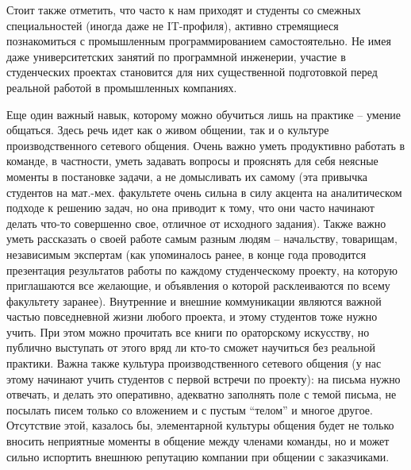 \documentclass[a4paper]{article}
\begin{document}
Стоит также отметить, что часто к нам приходят и студенты со смежных специальностей (иногда даже не IT-профиля), активно стремящиеся познакомиться с промышленным программированием самостоятельно. Не имея даже университетских занятий по программной инженерии, участие в студенческих проектах становится для них существенной подготовкой перед реальной работой в промышленных компаниях.

Еще один важный навык, которому можно обучиться лишь на практике -- умение общаться. Здесь речь идет как о живом общении, так и о культуре производственного сетевого общения.  Очень важно уметь продуктивно работать в команде, в частности, уметь задавать вопросы и прояснять для себя неясные моменты в постановке задачи, а не домысливать их самому (эта привычка студентов на мат.-мех. факультете очень сильна в силу акцента на аналитическом подходе к решению задач, но она приводит к тому, что они часто начинают делать что-то совершенно свое, отличное от исходного задания). Также важно уметь рассказать о своей работе самым разным людям -- начальству, товарищам, независимым экспертам (как упоминалось ранее, в конце года проводится презентация результатов работы по каждому студенческому проекту, на которую приглашаются все желающие, и объявления о которой расклеиваются по всему факультету заранее). Внутренние и внешние коммуникации являются важной частью повседневной жизни любого проекта, и этому студентов тоже нужно учить. При этом можно прочитать все книги по ораторскому искусству, но публично выступать от этого вряд ли кто-то сможет научиться без реальной практики. Важна также культура производственного сетевого общения (у нас этому начинают учить студентов с первой встречи по проекту): на письма нужно отвечать, и делать это оперативно, адекватно заполнять поле с темой письма, не посылать писем только со вложением и с пустым ``телом'' и многое другое. Отсутствие этой, казалось бы, элементарной культуры общения будет не только вносить неприятные моменты в общение между членами команды, но и может сильно испортить внешнюю репутацию компании при общении с заказчиками.
\end{document}
